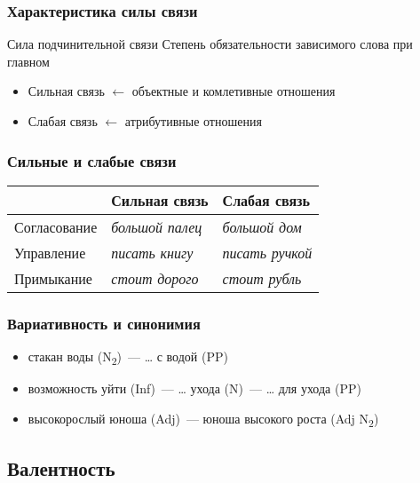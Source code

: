 \begin{frame}
  \frametitle{Характеристика силы связи}

  \begin{alertblock}{Сила подчинительной связи}
     Степень обязательности зависимого слова при главном
  \end{alertblock}

  \vfill

  \begin{itemize}
    \item Сильная связь $\leftarrow$ объектные и комлетивные отношения
    \item Слабая связь $\leftarrow$ атрибутивные отношения
  \end{itemize}
\end{frame}

\begin{frame}
  \frametitle{Сильные и слабые связи}

  \begin{table}
    \begin{tabularx}{.9\textwidth}{XXX}
      & Сильная связь & Слабая связь \\ \midrule \midrule
      Согласование & \textit{большой палец} & \textit{большой дом} \\ \midrule
      Управление & \textit{писать книгу} & \textit{писать ручкой} \\ \midrule
      Примыкание & \textit{стоит дорого} & \textit{стоит рубль} \\
    \end{tabularx}
  \end{table}
\end{frame}

\begin{frame}
  \frametitle{Вариативность и синонимия}

  \begin{itemize}
    \item стакан воды (N\textsubscript{2})~--- \ldots{} с водой (PP)
    \item возможность уйти (Inf)~--- \ldots{} ухода (N)~--- \ldots{} для ухода (PP)
    \item высокорослый юноша (Adj)~--- юноша высокого роста (Adj N\textsubscript{2})
  \end{itemize}
\end{frame}

\subsection{Валентность}

